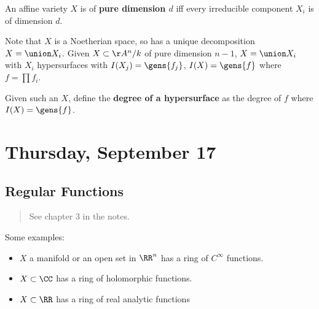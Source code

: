 \begin{definition}

An affine variety \(X\) is of \textbf{pure dimension \(d\)} iff every
irreducible component \(X_i\) is of dimension \(d\).

\end{definition}

\begin{remark}

Note that \(X\) is a Noetherian space, so has a unique decomposition
\(X = \union X_i\). Given \(X\subset \AA^n/k\) of pure dimension
\(n-1\), \(X = \union X_i\) with \(X_i\) hypersurfaces with
\(I(X_j) = \gens{f_j}\), \(I(X) = \gens{f}\) where \(f = \prod f_i\).

\end{remark}

\begin{definition}

Given such an \(X\), define the \textbf{degree of a hypersurface} as the
degree of \(f\) where \(I(X) = \gens{f}\).

\end{definition}

\hypertarget{thursday-september-17}{%
\section{Thursday, September 17}\label{thursday-september-17}}

\hypertarget{regular-functions}{%
\subsection{Regular Functions}\label{regular-functions}}

\begin{quote}
See chapter 3 in the notes.
\end{quote}

Some examples:

\begin{itemize}
\tightlist
\item
  \(X\) a manifold or an open set in \(\RR^n\) has a ring of
  \(C^\infty\) functions.
\item
  \(X \subset \CC\) has a ring of holomorphic functions.
\item
  \(X\subset \RR\) has a ring of real analytic functions
\end{itemize}

